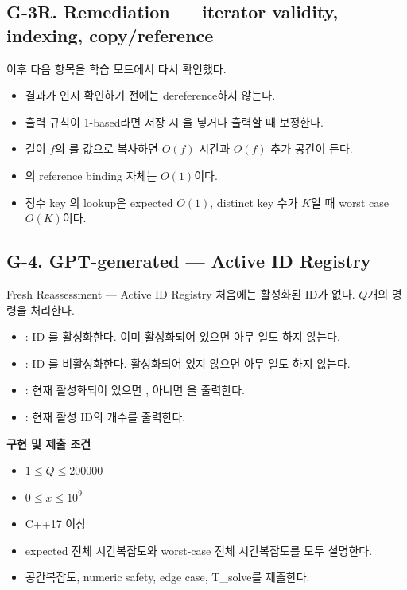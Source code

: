 \subsection{G-3R. Remediation --- iterator validity, indexing, copy/reference}
이후 다음 항목을 학습 모드에서 다시 확인했다.
\begin{itemize}
\item {} 결과가 인지 확인하기 전에는 dereference하지 않는다.
\item 출력 규칙이 1-based라면 저장 시 을 넣거나 출력할 때 보정한다.
\item 길이 $f$의 를 값으로 복사하면 $O(f)$ 시간과 $O(f)$ 추가 공간이 든다.
\item {}의 reference binding 자체는 $O(1)$이다.
\item 정수 key 의 lookup은 expected $O(1)$, distinct key 수가 $K$일 때 worst case $O(K)$이다.
\end{itemize}

\subsection{G-4. GPT-generated --- Active ID Registry}
\begin{problembox}{Fresh Reassessment --- Active ID Registry}
처음에는 활성화된 ID가 없다. $Q$개의 명령을 처리한다.
\begin{itemize}
\item {}: ID 를 활성화한다. 이미 활성화되어 있으면 아무 일도 하지 않는다.
\item {}: ID 를 비활성화한다. 활성화되어 있지 않으면 아무 일도 하지 않는다.
\item {}: 현재 활성화되어 있으면 , 아니면 을 출력한다.
\item {}: 현재 활성 ID의 개수를 출력한다.
\end{itemize}

\textbf{구현 및 제출 조건}
\begin{itemize}
\item $1\le Q\le200000$
\item $0\le x\le10^9$
\item C++17 이상
\item expected 전체 시간복잡도와 worst-case 전체 시간복잡도를 모두 설명한다.
\item 공간복잡도, numeric safety, edge case, T\_solve를 제출한다.
\end{itemize}
\end{problembox}

